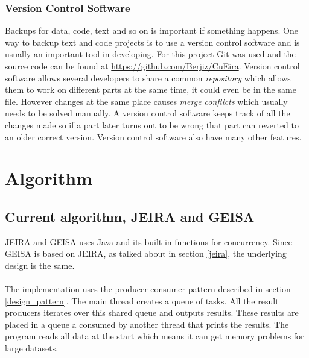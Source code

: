 \documentclass[10pt,a4paper]{report}
\begin{document}
\subsection{Version Control Software}
Backups for data, code, text and so on is important if something happens. One way to backup text and code projects is to use a version control software and is usually an important tool in developing\cite{git_book}. For this project Git was used and the source code can be found at \url{https://github.com/Berjiz/CuEira}. Version control software allows several developers to share a common \emph{repository} which allows them to work on different parts at the same time, it could even be in the same file\cite{git_book}. However changes at the same place causes \emph{merge conflicts} which usually needs to be solved manually\cite{git_book}. A version control software keeps track of all the changes made so if a part later turns out to be wrong that part can reverted to an older correct version\cite{git_book}. Version control software also have many other features\cite{git_book}.

\clearpage
\chapter{Algorithm}







\section{Current algorithm, JEIRA and GEISA}
JEIRA and GEISA uses Java and its built-in functions for concurrency. Since GEISA is based on JEIRA, as talked about in section \ref{jeira}, the underlying design is the same.\\
\\
The implementation uses the producer consumer pattern described in section \ref{design_pattern}. The main thread creates a queue of tasks. All the result producers iterates over this shared queue and outputs results. These results are placed in a queue a consumed by another thread that prints the results. The program reads all data at the start which means it can get memory problems for large datasets.
\end{document}
